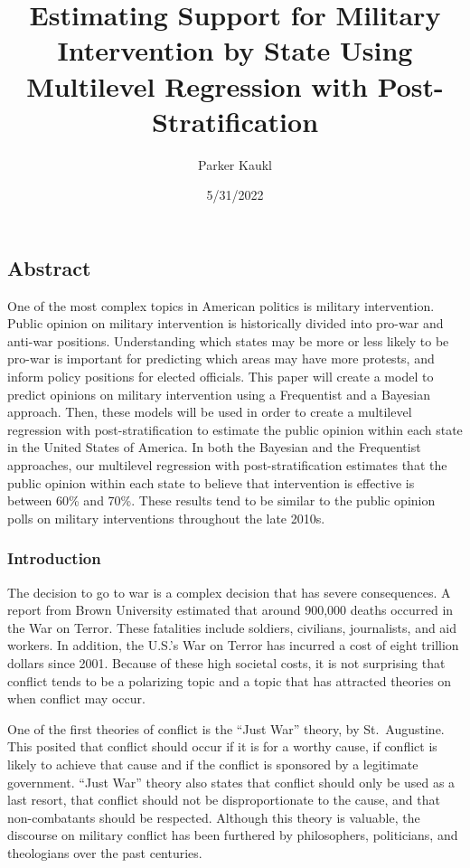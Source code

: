 \documentclass[
  11pt,
]{article}
\title{Estimating Support for Military Intervention by State Using
Multilevel Regression with Post-Stratification}
\author{Parker Kaukl}
\date{5/31/2022}
\begin{document}
\maketitle

\hypertarget{abstract}{%
\subsection{Abstract}\label{abstract}}

One of the most complex topics in American politics is military
intervention. Public opinion on military intervention is historically
divided into pro-war and anti-war positions. Understanding which states
may be more or less likely to be pro-war is important for predicting
which areas may have more protests, and inform policy positions for
elected officials. This paper will create a model to predict opinions on
military intervention using a Frequentist and a Bayesian approach. Then,
these models will be used in order to create a multilevel regression
with post-stratification to estimate the public opinion within each
state in the United States of America. In both the Bayesian and the
Frequentist approaches, our multilevel regression with
post-stratification estimates that the public opinion within each state
to believe that intervention is effective is between 60\% and 70\%.
These results tend to be similar to the public opinion polls on military
interventions throughout the late 2010s. \newpage

\hypertarget{introduction}{%
\subsubsection{Introduction}\label{introduction}}

The decision to go to war is a complex decision that has severe
consequences. A report from Brown University estimated that around
900,000 deaths occurred in the War on Terror. These fatalities include
soldiers, civilians, journalists, and aid workers. In addition, the
U.S.'s War on Terror has incurred a cost of eight trillion dollars since
2001. Because of these high societal costs, it is not surprising that
conflict tends to be a polarizing topic and a topic that has attracted
theories on when conflict may occur.

One of the first theories of conflict is the ``Just War'' theory, by
St.~Augustine. This posited that conflict should occur if it is for a
worthy cause, if conflict is likely to achieve that cause and if the
conflict is sponsored by a legitimate government. ``Just War'' theory
also states that conflict should only be used as a last resort, that
conflict should not be disproportionate to the cause, and that
non-combatants should be respected. Although this theory is valuable,
the discourse on military conflict has been furthered by philosophers,
politicians, and theologians over the past centuries.
\end{document}
